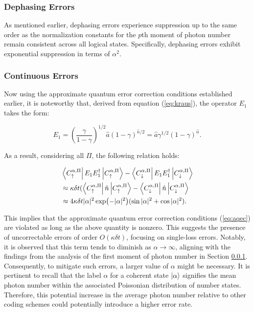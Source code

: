 \documentclass[11pt]{article}
\newcommand\0{\mathbf{0}}
\newcommand\<{\langle}
\renewcommand\>{\rangle}
\begin{document}
\subsubsection{Dephasing Errors}
\label{sec:cat-deph}

As mentioned earlier, dephasing errors experience suppression up to the same order as the normalization constants for the $p$th moment of photon number remain consistent across all logical states. Specifically, dephasing errors exhibit exponential suppression in terms of $\alpha^2$.


\subsubsection{Continuous Errors}

Now using the approximate quantum error correction conditions established earlier, it is noteworthy that, derived from equation (\ref{eq:kraus}), the operator \(E_1\) takes the form: 

\[ E_1 = \left(\frac{\gamma}{1-\gamma}\right)^{1 / 2} \hat{a} (1 - \gamma)^{\hat{n} / 2} = \hat{a} \gamma^{1/2} (1- \gamma)^{\hat{n}}. \]

As a result, considering all \(\Pi\), the following relation holds:

\begin{align*}
&\bra{C^{\alpha, \Pi}_{\uparrow}}E_1E_1^\dag\ket{C^{\alpha, \Pi}_{\uparrow}} - \bra{C^{\alpha, \Pi}_{\downarrow}}	E_1E_1^\dag\ket{C^{\alpha, \Pi}_{\downarrow}}	\\
&\approx \kappa\delta t (\bra{C^{\alpha, \Pi}_{\uparrow}}\hat{n}\ket{C^{\alpha, \Pi}_{\uparrow}} - \bra{C^{\alpha, \Pi}_{\downarrow}}	\hat{n}\ket{C^{\alpha, \Pi}_{\downarrow}}\\
&\approx 4 \kappa \delta t |\alpha|^2  \exp(-|\alpha|^2)(\sin |\alpha|^2 + \cos|\alpha|^2).
\end{align*}

This implies that the approximate quantum error correction conditions (\ref{eq:aqec}) are violated as long as the above quantity is nonzero. This suggests the presence of uncorrectable errors of order \(O(\kappa \delta t)\), focusing on single-loss errors. Notably, it is observed that this term tends to diminish as \(\alpha\rightarrow \infty\), aligning with the findings from the analysis of the first moment of photon number in Section \ref{sec:cat-deph}. Consequently, to mitigate such errors, a larger value of \(\alpha\) might be necessary. It is pertinent to recall that the label \(\alpha\) for a coherent state \(\ket{\alpha}\) signifies the mean photon number within the associated Poissonian distribution of number states. Therefore, this potential increase in the average photon number relative to other coding schemes could potentially introduce a higher error rate.
\end{document}
